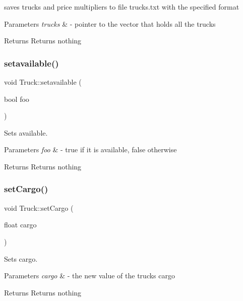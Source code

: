 saves trucks and price multipliers to file trucks.\+txt with the specified format 


\begin{DoxyParams}{Parameters}
{\em trucks} & -\/ pointer to the vector that holds all the trucks \\
\hline
\end{DoxyParams}
\begin{DoxyReturn}{Returns}
Returns nothing 
\end{DoxyReturn}
\mbox{\label{class_truck_a59ca935a364da118131ed85647aa4f0d}} 
\subsubsection{\texorpdfstring{setavailable()}{setavailable()}}
{\footnotesize\ttfamily void Truck\+::setavailable (\begin{DoxyParamCaption}\item[{bool}]{foo }\end{DoxyParamCaption})}



Sets available. 


\begin{DoxyParams}{Parameters}
{\em foo} & -\/ true if it is available, false otherwise \\
\hline
\end{DoxyParams}
\begin{DoxyReturn}{Returns}
Returns nothing 
\end{DoxyReturn}
\mbox{\label{class_truck_ac26288a4d560deb5383fd07618fb13e6}} 
\subsubsection{\texorpdfstring{set\+Cargo()}{setCargo()}}
{\footnotesize\ttfamily void Truck\+::set\+Cargo (\begin{DoxyParamCaption}\item[{float}]{cargo }\end{DoxyParamCaption})}



Sets cargo. 


\begin{DoxyParams}{Parameters}
{\em cargo} & -\/ the new value of the truck\textquotesingle{}s cargo \\
\hline
\end{DoxyParams}
\begin{DoxyReturn}{Returns}
Returns nothing 
\end{DoxyReturn}
\mbox{\label{class_truck_a9268e17e1a967d1702b28c6940403aa4}} 
